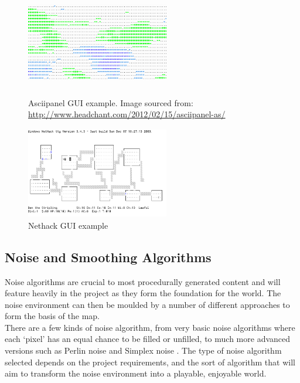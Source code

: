 \documentclass[12pt,a4paper]{article}
\begin{document}
\begin{figure}
\centering
 	\includegraphics[width=6.25cm,height=4cm]{images/asciipanel1inv.png}
	\caption[]{Asciipanel GUI example. Image sourced from: \url{http://www.headchant.com/2012/02/15/asciipanel-as/}}
	\label{fig:fig1}
	\vspace{2ex}
	\includegraphics[width=6.25cm, height=4cm]{images/nethack2.png}
  \caption[]{Nethack GUI example}
  \label{fig:fig2}
 \end{figure}



\subsection{Noise and Smoothing Algorithms}
\label{subsec:noise}

Noise algorithms are crucial to most procedurally generated content and will feature heavily in the project as they form the foundation for the world. The noise environment can then be moulded by a number of different approaches to form the basis of the map. \\

There are a few kinds of noise algorithm, from very basic noise algorithms where each `pixel' has an equal chance to be filled or unfilled, to much more advanced versions such as Perlin noise and Simplex noise \cite{textmodel}\cite{improvepnoise}. The type of noise algorithm selected depends on the project requirements, and the sort of algorithm that will aim to transform the noise environment into a playable, enjoyable world. 

\end{document}
